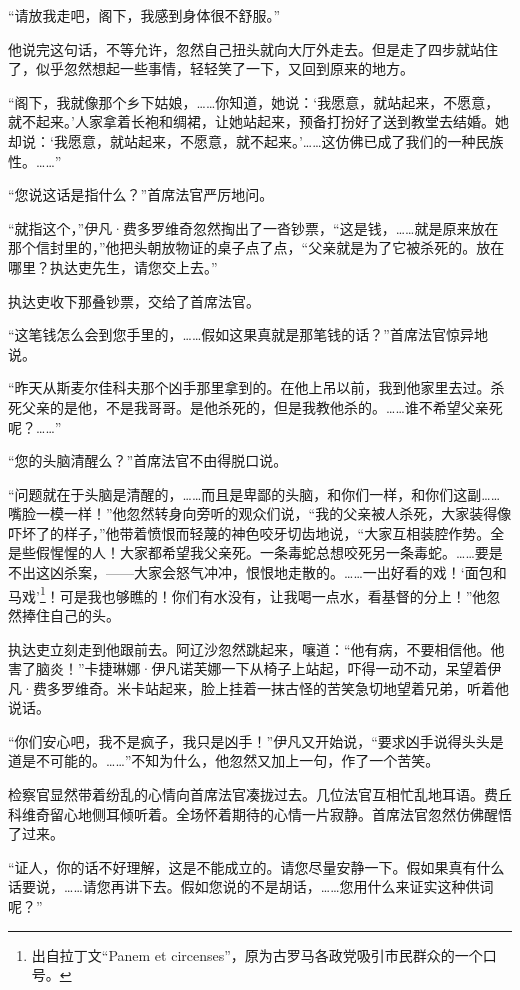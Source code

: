 \par “请放我走吧，阁下，我感到身体很不舒服。”
\par 他说完这句话，不等允许，忽然自己扭头就向大厅外走去。但是走了四步就站住了，似乎忽然想起一些事情，轻轻笑了一下，又回到原来的地方。
\par “阁下，我就像那个乡下姑娘，……你知道，她说：‘我愿意，就站起来，不愿意，就不起来。’人家拿着长袍和绸裙，让她站起来，预备打扮好了送到教堂去结婚。她却说：‘我愿意，就站起来，不愿意，就不起来。’……这仿佛已成了我们的一种民族性。……”
\par “您说这话是指什么？”首席法官严厉地问。
\par “就指这个，”伊凡·费多罗维奇忽然掏出了一沓钞票，“这是钱，……就是原来放在那个信封里的，”他把头朝放物证的桌子点了点，“父亲就是为了它被杀死的。放在哪里？执达吏先生，请您交上去。”
\par 执达吏收下那叠钞票，交给了首席法官。
\par “这笔钱怎么会到您手里的，……假如这果真就是那笔钱的话？”首席法官惊异地说。
\par “昨天从斯麦尔佳科夫那个凶手那里拿到的。在他上吊以前，我到他家里去过。杀死父亲的是他，不是我哥哥。是他杀死的，但是我教他杀的。……谁不希望父亲死呢？……”
\par “您的头脑清醒么？”首席法官不由得脱口说。
\par “问题就在于头脑是清醒的，……而且是卑鄙的头脑，和你们一样，和你们这副……嘴脸一模一样！”他忽然转身向旁听的观众们说，“我的父亲被人杀死，大家装得像吓坏了的样子，”他带着愤恨而轻蔑的神色咬牙切齿地说，“大家互相装腔作势。全是些假惺惺的人！大家都希望我父亲死。一条毒蛇总想咬死另一条毒蛇。……要是不出这凶杀案，——大家会怒气冲冲，恨恨地走散的。……一出好看的戏！‘面包和马戏’\footnote{出自拉丁文“Panem et circenses”，原为古罗马各政党吸引市民群众的一个口号。}！可是我也够瞧的！你们有水没有，让我喝一点水，看基督的分上！”他忽然捧住自己的头。
\par 执达吏立刻走到他跟前去。阿辽沙忽然跳起来，嚷道：“他有病，不要相信他。他害了脑炎！”卡捷琳娜·伊凡诺芙娜一下从椅子上站起，吓得一动不动，呆望着伊凡·费多罗维奇。米卡站起来，脸上挂着一抹古怪的苦笑急切地望着兄弟，听着他说话。
\par “你们安心吧，我不是疯子，我只是凶手！”伊凡又开始说，“要求凶手说得头头是道是不可能的。……”不知为什么，他忽然又加上一句，作了一个苦笑。
\par 检察官显然带着纷乱的心情向首席法官凑拢过去。几位法官互相忙乱地耳语。费丘科维奇留心地侧耳倾听着。全场怀着期待的心情一片寂静。首席法官忽然仿佛醒悟了过来。
\par “证人，你的话不好理解，这是不能成立的。请您尽量安静一下。假如果真有什么话要说，……请您再讲下去。假如您说的不是胡话，……您用什么来证实这种供词呢？”
